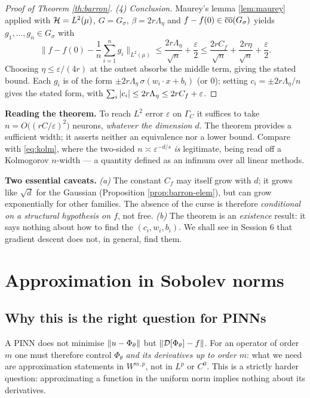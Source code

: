 \documentclass[11pt,a4paper]{article}
\begin{document}
\begin{proof}[Proof of Theorem \ref{th:barron}]
\smallskip\noindent
\emph{(4) Conclusion.} Maurey's lemma \ref{lem:maurey} applied with $\mathcal{H} = L^2(\mu)$,
$G = G_\sigma$, $\beta = 2r\Lambda_\eta$ and $f - f(0) \in \overline{\operatorname{co}}(G_\sigma)$ yields
$g_1,\dots,g_n \in G_\sigma$ with
\[
\Big\| f - f(0) - \frac1n \sum_{i=1}^n g_i \Big\|_{L^2(\mu)}
\le \frac{2r\Lambda_\eta}{\sqrt n} + \frac{\varepsilon}{2}
\le \frac{2rC_f}{\sqrt n} + \frac{2r\eta}{\sqrt n} + \frac{\varepsilon}{2} .
\]
Choosing $\eta \le \varepsilon/(4r)$ at the outset absorbs the middle term, giving the stated
bound. Each $g_i$ is of the form $\pm 2r\Lambda_\eta\,\sigma(w_i\cdot x + b_i)$ (or $0$); setting
$c_i = \pm 2r\Lambda_\eta/n$ gives the stated form, with
$\sum_i \left\lvert c_i \right\rvert \le 2r\Lambda_\eta \le 2rC_f + \varepsilon$.
\end{proof}

\begin{keybox}
\textbf{Reading the theorem.} To reach $L^2$ error $\varepsilon$ on $\Gamma_C$ it suffices to take
$n = O\big((rC/\varepsilon)^2\big)$ neurons, \emph{whatever the dimension $d$}. The theorem provides
a sufficient width; it asserts neither an equivalence nor a lower bound. Compare with
\eqref{eq:kolm}, where the two-sided $n \asymp \varepsilon^{-d/s}$ \emph{is} legitimate, being read
off a Kolmogorov $n$-width --- a quantity defined as an infimum over all linear methods.

\smallskip
\textbf{Two essential caveats.} \emph{(a)} The constant $C_f$ may itself grow with $d$; it grows
like $\sqrt d$ for the Gaussian (Proposition \ref{prop:barron-elem}), but can grow exponentially
for other families. The absence of the curse is therefore \emph{conditional on a structural
hypothesis on $f$}, not free. \emph{(b)} The theorem is an \emph{existence} result: it says nothing
about how to find the $(c_i,w_i,b_i)$. We shall see in Session 6 that gradient descent does not, in
general, find them.
\end{keybox}

\section{Approximation in Sobolev norms}

\subsection{Why this is the right question for PINNs}

A PINN does not minimise $\left\lVert u - \Phi_\theta \right\rVert$ but $\left\lVert \mathcal{D}[\Phi_\theta] - f \right\rVert$. For an
operator of order $m$ one must therefore control $\Phi_\theta$ \emph{and its derivatives up to
order $m$}: what we need are approximation statements in $W^{m,p}$, not in $L^p$ or $C^0$. This is
a strictly harder question: approximating a function in the uniform norm implies nothing about its
derivatives.
\end{document}
